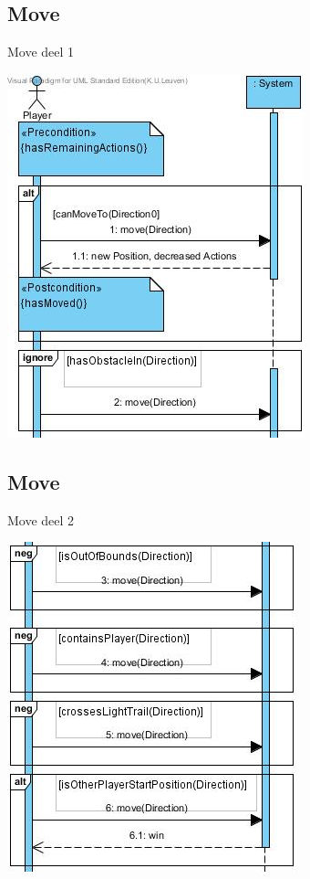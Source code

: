 \documentclass[t]{beamer}
\begin{document}
\subsection{Move}
\begin{frame}{Move deel 1}
\begin{center}
\includegraphics[scale=0.6]{images/SSDMove1}
\end{center}
\end{frame}

\subsection{Move}
\begin{frame}{Move deel 2}
\begin{center}
\includegraphics[scale=0.7]{images/SSDMove2}
\end{center}
\end{frame}
\end{document}

